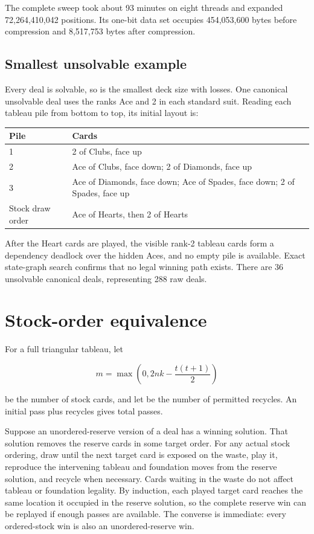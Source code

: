 \documentclass[11pt]{article}
\begin{document}
The complete \texttt{} sweep took about 93 minutes on eight threads and expanded 72,264,410,042 positions. Its one-bit data set occupies 454,053,600 bytes before compression and 8,517,753 bytes after compression.

\subsection{Smallest unsolvable example}

Every \texttt{} deal is solvable, so \texttt{} is the smallest deck size with losses. One canonical unsolvable deal uses the ranks Ace and 2 in each standard suit. Reading each tableau pile from bottom to top, its initial layout is:

\begin{center}
\begin{tabularx}{\textwidth}{@{}p{}Y@{}}
\toprule
\textbf{Pile} & \textbf{Cards} \\
 & 2 of Clubs, face up \\
2 & Ace of Clubs, face down; 2 of Diamonds, face up \\
3 & Ace of Diamonds, face down; Ace of Spades, face down; 2 of Spades, face up \\
Stock draw order & Ace of Hearts, then 2 of Hearts \\
\bottomrule
\end{tabularx}
\end{center}

After the Heart cards are played, the visible rank-2 tableau cards form a dependency deadlock over the hidden Aces, and no empty pile is available. Exact state-graph search confirms that no legal winning path exists. There are 36 unsolvable canonical \texttt{} deals, representing 288 raw deals.

\section{Stock-order equivalence}

For a full triangular tableau, let

\[
m=\max\left(0,2nk-\frac{t(t+1)}{2}\right)
\]

be the number of stock cards, and let \texttt{} be the number of permitted recycles. An initial pass plus \texttt{} recycles gives \texttt{} total passes.

Suppose an unordered-reserve version of a deal has a winning solution. That solution removes the \texttt{} reserve cards in some target order. For any actual stock ordering, draw until the next target card is exposed on the waste, play it, reproduce the intervening tableau and foundation moves from the reserve solution, and recycle when necessary. Cards waiting in the waste do not affect tableau or foundation legality. By induction, each played target card reaches the same location it occupied in the reserve solution, so the complete reserve win can be replayed if enough passes are available. The converse is immediate: every ordered-stock win is also an unordered-reserve win.
\end{document}
